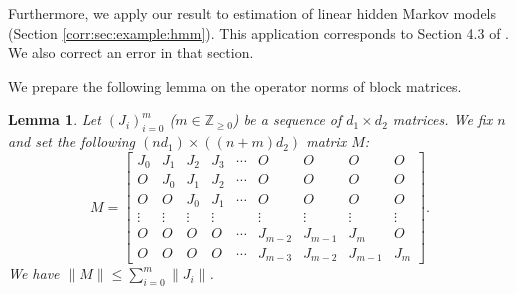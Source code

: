 \documentclass[11pt,a4paper]{article}
\newtheorem{lemma}[theorem]{Lemma}
\theoremstyle{remark}
\theoremstyle{definition}
\newcommand{\bfJ}{J}
\newcommand{\bfM}{M}
\newcommand{\bfO}{O}
\newcommand{\Z}{\mathbb{Z}}
\theoremstyle{definition}
\begin{document}
\begin{bibunit}[apalike]
Furthermore, we apply our result to estimation of linear hidden Markov models (Section \ref{corr:sec:example:hmm}).
This application corresponds to Section 4.3 of \citet{nakakita2024dimension}. We also correct an error in that section.


We prepare the following lemma on the operator norms of block matrices.
\begin{lemma}\label{lem:causalblock}
    Let $(\bfJ_{i})_{i=0}^{m}$ ($m\in\Z_{\ge0}$) be a sequence of $d_{1}\times d_{2}$ matrices.
    We fix $n$ and set the following $(nd_{1})\times ((n+m)d_{2})$ matrix $\bfM$:
    \begin{equation*}
        \bfM=\left[\begin{matrix}
            \bfJ_{0} & \bfJ_{1} & \bfJ_{2} & \bfJ_{3} & \cdots & \bfO & \bfO & \bfO & \bfO\\
            \bfO & \bfJ_{0} & \bfJ_{1} & \bfJ_{2} & \cdots & \bfO & \bfO & \bfO & \bfO\\
            \bfO & \bfO & \bfJ_{0} & \bfJ_{1} & \cdots & \bfO & \bfO & \bfO & \bfO\\
            \vdots & \vdots & \vdots & \vdots & & \vdots & \vdots & \vdots & \vdots \\
            \bfO & \bfO & \bfO & \bfO & \cdots &  \bfJ_{m-2} & \bfJ_{m-1} & \bfJ_{m} & \bfO \\
            \bfO & \bfO & \bfO & \bfO & \cdots & \bfJ_{m-3} & \bfJ_{m-2} & \bfJ_{m-1} & \bfJ_{m}
        \end{matrix}\right].
    \end{equation*}
    We have $\|\bfM\|\le \sum_{i=0}^{m}\|\bfJ_{i}\|$.
\end{lemma}


\end{bibunit}
\end{document}
